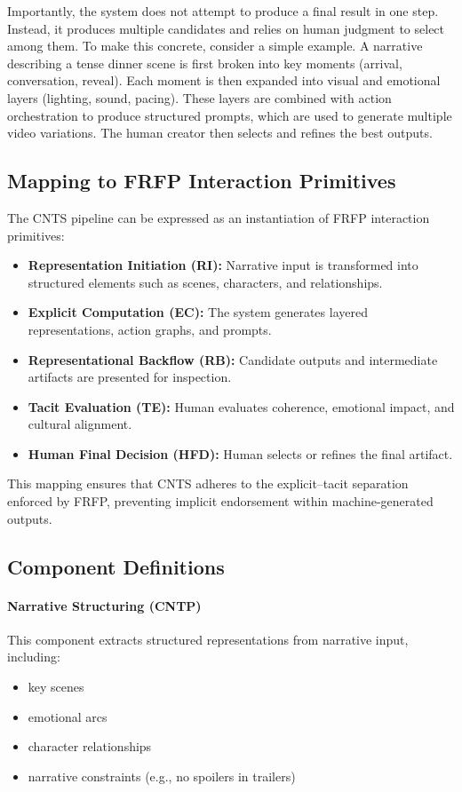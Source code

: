 \documentclass[preprints,article,submit,pdftex,moreauthors,accept]{Definitions/mdpi}
\begin{document}
Importantly, the system does not attempt to produce a final result in one step. Instead, it produces multiple candidates and relies on human judgment to select among them. To make this concrete, consider a simple example. A narrative describing a tense dinner scene is first broken into key moments (arrival, conversation, reveal). Each moment is then expanded into visual and emotional layers (lighting, sound, pacing). These layers are combined with action orchestration to produce structured prompts, which are used to generate multiple video variations. The human creator then selects and refines the best outputs.


\subsection{Mapping to FRFP Interaction Primitives}

The CNTS pipeline can be expressed as an instantiation of FRFP interaction primitives:

\begin{itemize}
    \item \textbf{Representation Initiation (RI):} Narrative input is transformed into structured elements such as scenes, characters, and relationships.
    \item \textbf{Explicit Computation (EC):} The system generates layered representations, action graphs, and prompts.
    \item \textbf{Representational Backflow (RB):} Candidate outputs and intermediate artifacts are presented for inspection.
    \item \textbf{Tacit Evaluation (TE):} Human evaluates coherence, emotional impact, and cultural alignment.
    \item \textbf{Human Final Decision (HFD):} Human selects or refines the final artifact.
\end{itemize}

This mapping ensures that CNTS adheres to the explicit–tacit separation enforced by FRFP, preventing implicit endorsement within machine-generated outputs.

\subsection{Component Definitions}

\paragraph{Narrative Structuring (CNTP)}
This component extracts structured representations from narrative input, including:
\begin{itemize}
    \item key scenes
    \item emotional arcs
    \item character relationships
    \item narrative constraints (e.g., no spoilers in trailers)
\end{itemize}
\end{document}
